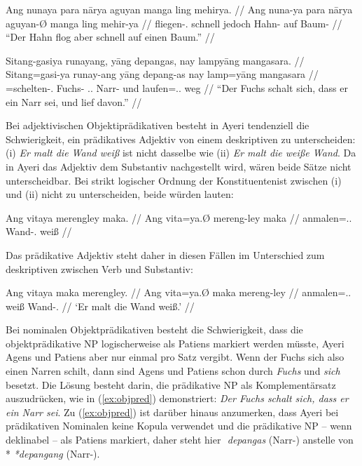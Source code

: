 \documentclass[12pt,paper=a4]{scrartcl}
\newcommand{\PargI}{{\Parg}.{\Inan}}
\newcommand{\TsgM}{{\Tsg}.{\M}}
\newcommand{\fw}[1]{\textit{#1}} %
\newcommand{\zwsp}{\mbox{​}} %
\newcommand{\rayr}[2]{\zwsp\smash{{\Tagati #1}} \emph{#2}} %
\begin{document}
\pex %
\a\begingl
	\gla Ang nunaya para nārya aguyan manga ling mehirya. //
	\glb Ang nuna-ya para nārya aguyan-Ø manga ling mehir-ya //
	\glc \AgtT{} fliegen-\TsgM{} schnell jedoch Hahn-\Top{} \Dyn{} auf Baum-\Loc{} //
	\glft \enquote{Der Hahn flog aber schnell auf einen Baum.} //
\endgl

\a\label{ex:objpred}\begingl
	\gla Sitang-gasiya runayang, yāng depangas, nay lampyāng mangasara. //
	\glb Sitang=gasi-ya runay-ang yāng depang-as nay lamp=yāng mangasara //
	\glc \Refl{}=schelten-\TsgM{} Fuchs-\Aarg{} \TsgM{}.\Aarg{} Narr-\Parg{} und laufen=\TsgM{}.\Aarg{} weg //
	\glft \enquote{Der Fuchs schalt sich, dass er ein Narr sei, und lief davon.} //
\endgl

\xe

Bei adjektivischen Objektiprädikativen besteht in Ayeri tendenziell die Schwierigkeit, ein prädikatives Adjektiv von einem deskriptiven zu unterscheiden: (i) \fw{Er malt die Wand weiß} ist nicht dasselbe wie (ii) \fw{Er malt die weiße Wand}. Da in Ayeri das Adjektiv dem Substantiv nachgestellt wird, wären beide Sätze nicht unterscheidbar. Bei strikt logischer Ordnung der Konstituentenist zwischen (i) und (ii) nicht zu unterscheiden, beide würden lauten:

\exdisplay[everygl=\hspace*{1em}]\noexno
\begingl
	\gla Ang vitaya merengley maka. //
	\glb Ang vita=ya.Ø mereng-ley maka //
	\glc \AgtT{} anmalen=\TsgM{}.\Top{} Wand-\PargI{} weiß //
\endgl
\xe

Das prädikative Adjektiv steht daher in diesen Fällen im Unterschied zum deskriptiven zwischen Verb und Substantiv:

\exdisplay[everygl=\hspace*{1em}]\noexno
\begingl
	\gla Ang vitaya maka merengley. //
	\glb Ang vita=ya.Ø maka mereng-ley //
	\glc \AgtT{} anmalen=\TsgM{}.\Top{} weiß Wand-\PargI{} //
	\glft `Er malt die Wand weiß.' //
\endgl
\xe

Bei nominalen Objektprädikativen besteht die Schwierigkeit, dass die objektprädikative NP logischerweise als Patiens markiert werden müsste, Ayeri Agens und Patiens aber nur einmal pro Satz vergibt. Wenn der Fuchs sich also einen Narren schilt, dann sind Agens und Patiens schon durch \fw{Fuchs} und \fw{sich} besetzt. Die Lösung besteht darin, die prädikative NP als Komplementärsatz auszudrücken, wie in (\ref{ex:objpred}) demonstriert: \fw{Der Fuchs schalt sich, dass er ein Narr sei}. Zu (\ref{ex:objpred}) ist darüber hinaus anzumerken, dass Ayeri bei prädikativen Nominalen keine Kopula verwendet und die prädikative NP -- wenn deklinabel -- als Patiens markiert, daher steht hier \rayr{depNsF}{depangas} (Narr-\Parg{}) anstelle von *\rayr{depNNF}{*depangang} (Narr-\Aarg{}).
\end{document}

